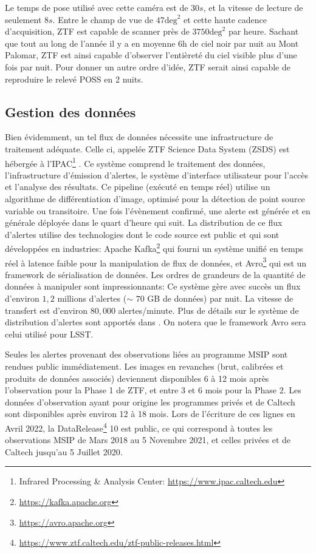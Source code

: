 \documentclass[../main/main.tex]{subfiles}
\begin{document}
Le temps de pose utilisé avec cette caméra est de $30s$, et la vitesse
de lecture de seulement $8s$. Entre le champ de vue de
$47\text{deg}^{2}$ et cette haute cadence d'acquisition, ZTF est capable
de scanner près de $3750\text{deg}^{2}$ par heure. Sachant que tout au long
de l'année il y a en moyenne 6h de ciel noir par nuit au Mont Palomar, ZTF est ainsi
capable d'observer l'entièreté du ciel visible plus d'une fois par
nuit. Pour donner un autre
ordre d'idée, ZTF serait ainsi capable de reproduire le relevé POSS
\citep{MinkowskiPOSS} en 2 nuits.


\subsection{Gestion des données}

Bien évidemment, un tel flux de données nécessite une infrastructure de
traitement adéquate. Celle ci, appelée ZTF Science Data System (ZSDS)
est hébergée à l'IPAC\footnote{Infrared Processing \& Analysis Center: \href{https://
www.ipac.caltech.edu}{https://www.ipac.caltech.edu}} \citep{MasciZTF2019}. Ce système
comprend le traitement des données, l'infrastructure
d'émission d'alertes, le système d'interface utilisateur pour l'accès
et l'analyse des résultats. Ce pipeline (exécuté en temps réel) utilise
un algorithme de différentiation d'image, optimisé pour la détection de
point source variable ou transitoire. Une fois l'évènement confirmé, une alerte est générée et
en générale déployée dans le quart d'heure qui suit. La distribution de
ce flux d'alertes utilise des technologies dont le code source est
public et qui sont développées
en industries: Apache Kafka\footnote{\url{https://kafka.apache.org}} qui
fourni un système unifié en temps réel à latence faible pour la
manipulation de flux de données, et
Avro\footnote{\url{https://avro.apache.org}} qui est un framework de
sérialisation de données. Les ordres de grandeurs de la quantité de
données à manipuler sont impressionnants: Ce système gère avec succès un
flux d'environ $1,2$ millions d'alertes ($\sim$ $70$ GB de données) par
nuit. La vitesse de transfert est d'environ $80,000$ alertes/minute. Plus
de détails sur le système de distribution d'alertes sont apportés dans
\citet{PattersonZTF2019}. On notera que le framework Avro sera celui utilisé
pour LSST.

Seules les alertes provenant des observations liées au programme MSIP
sont rendues public immédiatement. Les images en revanches (brut,
calibrées et produits de données associés) deviennent disponibles 6 à 12 mois 
après l'observation pour la Phase 1 de ZTF, et entre 3 et 6 mois pour la
Phase 2. Les données d'observation ayant pour origine les programmes
privés et de Caltech sont disponibles après environ 12 à 18 mois. Lors
de l'écriture de ces lignes en Avril 2022, la
DataRelease\footnote{\url{https://www.ztf.caltech.edu/ztf-public-releases.html}}
10 est public, ce qui correspond à toutes les observations MSIP de Mars 2018 au 5 Novembre
2021, et celles privées et de Caltech jusqu'au 5 Juillet 2020.
\end{document}
